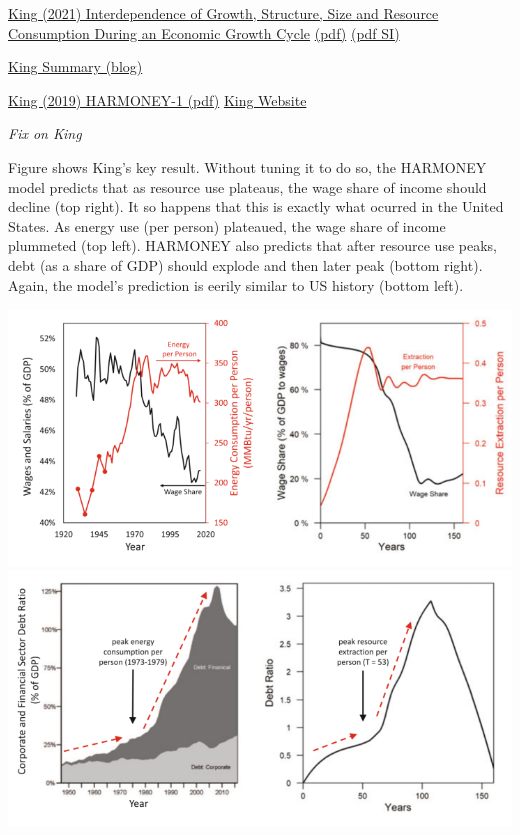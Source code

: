 \documentclass[
]{book}
\begin{document}
\href{https://link.springer.com/article/10.1007\%2Fs41247-021-00093-8}{King (2021) Interdependence of Growth, Structure, Size and Resource Consumption During an Economic Growth Cycle}
\href{pdf/King_2021_Interdependence_Growth_Structure_Size_Resource_Consumption.pdf}{(pdf)}
\href{pdf/King_2021_Interdependence_Growth_Structure_Size_Resource_Consumption_SI.pdf}{(pdf SI)}

\href{http://careyking.com/new-harmoney-insights-into-the-interdependence-of-growth-structure-size-and-resource-consumption-of-the-economy/}{King Summary (blog)}

\href{pdf/King_2019_HARMONEY-1.pdf}{King (2019) HARMONEY-1 (pdf)}
\href{http://careyking.com/}{King Website}

\emph{Fix on King}

Figure shows King's key result. Without tuning it to do so, the HARMONEY model predicts that as resource use plateaus, the wage share of income should decline (top right). It so happens that this is exactly what ocurred in the United States. As energy use (per person) plateaued, the wage share of income plummeted (top left). HARMONEY also predicts that after resource use peaks, debt (as a share of GDP) should explode and then later peak (bottom right). Again, the model's prediction is eerily similar to US history (bottom left).

\includegraphics{fig/fix_on_king.png}
\includegraphics{fig/fix_on_king2.png}
\end{document}
